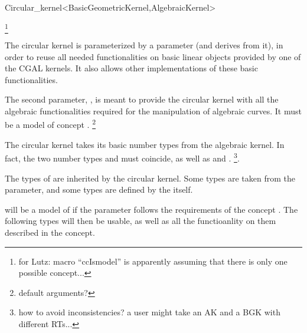 \begin{ccRefClass}{Circular_kernel<BasicGeometricKernel,AlgebraicKernel>}

\ccDefinition


\footnote{for Lutz: macro ``ccIsmodel'' is
apparently assuming that there is only one possible concept...}

\ccParameters

The circular kernel is parameterized by a  parameter
(and derives from it), in order to reuse all needed functionalities on
basic linear objects provided by one of the CGAL kernels. It also
allows other implementations of these basic functionalities.

The second parameter, , is meant to provide the
circular kernel with all the algebraic functionalities required for the
manipulation of algebraic curves. 
It must be a model of concept . 
\footnote{default arguments?}

\ccInheritsFrom


\ccTypes

\ccThreeToTwo

The circular kernel takes its basic number types from the algebraic kernel. 
In fact, the two number types  and
 must coincide, as well as
 and .
\footnote{how to avoid inconsistencies? a user might take an AK and a
BGK with different RTs...}. 

The types of  are inherited by the circular kernel.
Some types are taken from the  parameter, and
some types are defined by the  itself.

 will be a model of  if the 
 parameter follows the requirements of the 
concept . The following types will then be
usable, as well as all the functioanlity on them described in the
 concept. 

\ccGlue
{} 
\ccGlue
{}
\ccGlue
{}


\end{ccRefClass}
